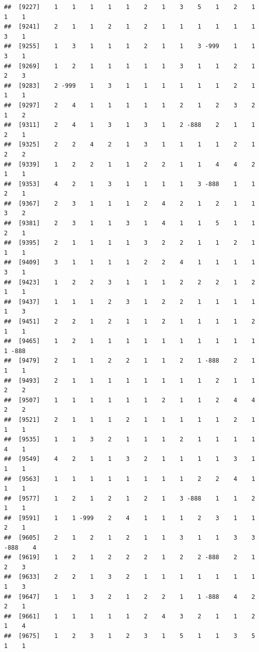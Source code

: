 \documentclass[
  12pt,
  openany]{book}
\begin{document}
\begin{verbatim}
##  [9227]    1    1    1    1    1    2    1    3    5    1    2    1    1    1
##  [9241]    2    1    1    2    1    2    1    1    1    1    1    1    3    1
##  [9255]    1    3    1    1    1    2    1    1    3 -999    1    1    3    1
##  [9269]    1    2    1    1    1    1    1    3    1    1    2    1    2    3
##  [9283]    2 -999    1    3    1    1    1    1    1    1    2    1    1    1
##  [9297]    2    4    1    1    1    1    1    2    1    2    3    2    1    2
##  [9311]    2    4    1    3    1    3    1    2 -888    2    1    1    2    1
##  [9325]    2    2    4    2    1    3    1    1    1    1    2    1    2    2
##  [9339]    1    2    2    1    1    2    2    1    1    4    4    2    1    1
##  [9353]    4    2    1    3    1    1    1    1    3 -888    1    1    2    1
##  [9367]    2    3    1    1    1    2    4    2    1    2    1    1    3    2
##  [9381]    2    3    1    1    3    1    4    1    1    5    1    1    2    1
##  [9395]    2    1    1    1    1    3    2    2    1    1    2    1    1    1
##  [9409]    3    1    1    1    1    2    2    4    1    1    1    1    3    1
##  [9423]    1    2    2    3    1    1    1    2    2    2    1    2    1    1
##  [9437]    1    1    1    2    3    1    2    2    1    1    1    1    1    3
##  [9451]    2    2    1    2    1    1    2    1    1    1    1    2    1    1
##  [9465]    1    2    1    1    1    1    1    1    1    1    1    1    1 -888
##  [9479]    2    1    1    2    2    1    1    2    1 -888    2    1    1    1
##  [9493]    2    1    1    1    1    1    1    1    1    2    1    1    2    2
##  [9507]    1    1    1    1    1    1    2    1    1    2    4    4    2    2
##  [9521]    2    1    1    1    2    1    1    1    1    1    2    1    1    1
##  [9535]    1    1    3    2    1    1    1    2    1    1    1    1    4    1
##  [9549]    4    2    1    1    3    2    1    1    1    1    3    1    1    1
##  [9563]    1    1    1    1    1    1    1    1    2    2    4    1    1    1
##  [9577]    1    2    1    2    1    2    1    3 -888    1    1    2    1    1
##  [9591]    1    1 -999    2    4    1    1    1    2    3    1    1    2    1
##  [9605]    2    1    2    1    2    1    1    3    1    1    3    3 -888    4
##  [9619]    1    2    1    2    2    2    1    2    2 -888    2    1    2    3
##  [9633]    2    2    1    3    2    1    1    1    1    1    1    1    1    3
##  [9647]    1    1    3    2    1    2    2    1    1 -888    4    2    2    1
##  [9661]    1    1    1    1    1    2    4    3    2    1    1    2    1    4
##  [9675]    1    2    3    1    2    3    1    5    1    1    3    5    1    1

\end{verbatim}
\end{document}
